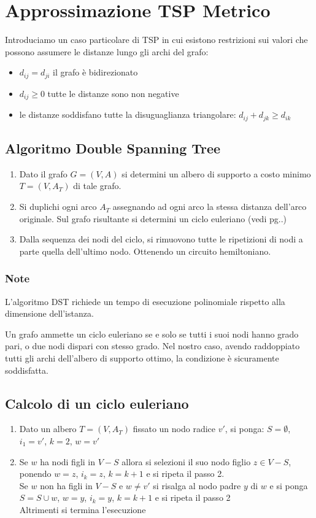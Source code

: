 \documentclass[../template]{subfiles}
\begin{document}
\section{Approssimazione TSP Metrico}
Introduciamo un caso particolare di TSP in cui esistono restrizioni sui valori che possono assumere le distanze lungo gli archi del grafo:
\begin{itemize}
    \item $d_{ij} = d_{ji}$ il grafo è bidirezionato
    \item $d_{ij} \ge 0$ tutte le distanze sono non negative
    \item le distanze soddisfano tutte la disuguaglianza triangolare: $d_{ij} + d_{jk} \ge d_{ik}$
\end{itemize}

\subsection{Algoritmo Double Spanning Tree}
\begin{enumerate}
    \item Dato il grafo $G = (V, A)$ si determini un albero di supporto a costo minimo $T = (V, A_T)$ di tale grafo.
    \item Si duplichi ogni arco $A_T$ assegnando ad ogni arco la stessa distanza dell'arco originale.
        Sul grafo risultante si determini un ciclo euleriano (vedi pg..)
    \item Dalla sequenza dei nodi del ciclo, si rimuovono tutte le ripetizioni di nodi a parte quella dell'ultimo nodo. Ottenendo un circuito hemiltoniano.
\end{enumerate}
\subsubsection{Note}
L'algoritmo DST richiede un tempo di esecuzione polinomiale rispetto alla dimensione dell'istanza.

Un grafo ammette un ciclo euleriano se e solo se tutti i suoi nodi hanno grado pari, o due nodi dispari con stesso grado.
Nel nostro caso, avendo raddoppiato tutti gli archi dell'albero di supporto ottimo, la condizione è sicuramente soddisfatta.

\subsection{Calcolo di un ciclo euleriano}
\begin{enumerate}
    \item Dato un albero $T = (V, A_T)$ fissato un nodo radice $v'$, si ponga:
        $S = \emptyset$,
        $i_1 = v'$,
        $k = 2$,
        $w = v'$
    \item Se $w$ ha nodi figli in $V - S$ allora si selezioni il suo nodo figlio $z \in V - S$, ponendo $w = z$, $i_k = z$, $k = k+1$
        e si ripeta il passo 2.
        \\
        Se $w$ non ha figli in $V - S$ e $w \neq v'$ si risalga al nodo padre $y$ di $w$ e si ponga
            $S = S \cup {w}$, $w = y$, $i_k = y$, $k=k+1$ e si ripeta il passo 2
        \\
        Altrimenti si termina l'esecuzione
\end{enumerate}
\end{document}

